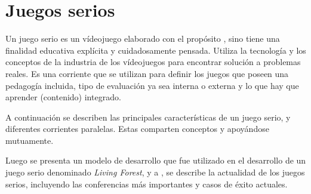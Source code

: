 \chapter{Juegos serios}
\label{chap:juegos_serios}

Un juego serio es un vídeojuego elaborado con el propósito \cite{sg:aoverview}, sino tiene una finalidad educativa explícita y
cuidadosamente pensada. Utiliza la tecnología y los conceptos de la industria de
los vídeojuegos para encontrar solución a problemas reales. Es una corriente que
se utilizan para definir los juegos que poseen una pedagogía incluida,
 tipo de evaluación ya sea interna o externa y
lo que hay que aprender (contenido) integrado\cite{damien:sg}.

A continuación se describen las principales características de un juego serio, y
diferentes corrientes paralelas. Estas comparten conceptos y apoyándose
mutuamente.

Luego se presenta un modelo de desarrollo que fue utilizado en el desarrollo de
un juego serio denominado \textit{Living Forest}, y a , se describe la actualidad de los juegos serios, incluyendo las
conferencias más importantes y casos de éxito actuales.









